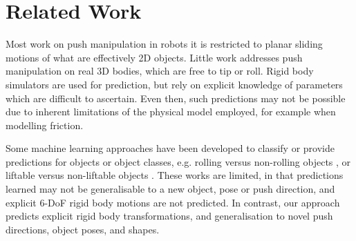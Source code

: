 \section{Related Work}\label{sec:Background}

Most work on push manipulation in robots
\cite{mason_manipulator_1982,lynch_mechanics_1992,peshkin_motion_1988,cappelleri_designing_2006}
it is restricted to planar sliding motions of what are effectively 2D
objects. Little work addresses push manipulation on real 3D bodies,
which are free to tip or roll. Rigid body simulators are used for
prediction, but rely on explicit knowledge of parameters which are
difficult to ascertain. Even then, such predictions may not be
possible due to inherent limitations of the physical model employed,
for example when modelling
friction.%

Some machine learning approaches have been developed to classify or
provide predictions for objects or object classes, e.g. rolling versus
non-rolling objects
\cite{fitzpatrick_learning_2003,ridge_towards_2008}, or liftable
versus non-liftable objects \cite{paletta_learning_2007}. These works
are limited, in that predictions learned may not be generalisable to a
new object, pose or push direction, and explicit 6-DoF rigid body
motions are not predicted. In contrast, our approach predicts explicit
rigid body transformations, and generalisation to novel push
directions, object poses, and shapes.


